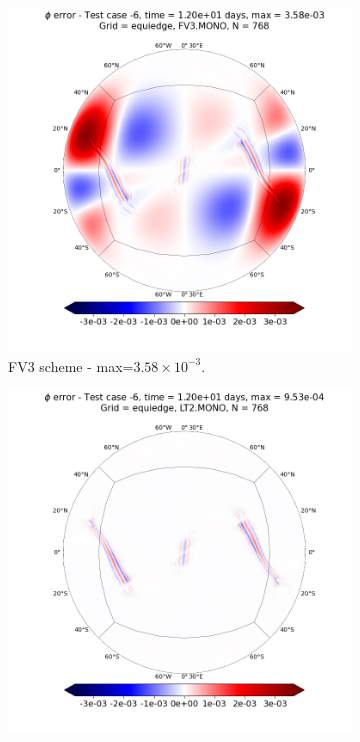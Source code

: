\documentclass[preprint,12pt]{elsarticle}
\begin{document}
\begin{linenumbers}
\begin{figure}[!htb]
	\centering
	\begin{subfigure}{0.45\textwidth}
		\centering
		\includegraphics[width=1.1\linewidth]{h_error_tc-6_t12_alpha0_C768_g0_dg2_adv1_hord8_mf1_tf12}
		\caption{FV3 scheme - max=$3.58 \times 10^{-3}$. \label{divnair-error-FV3}}
	\end{subfigure}
	\begin{subfigure}{0.45\textwidth}
		\centering
		\includegraphics[width=1.1\linewidth]{h_error_tc-6_t12_alpha0_C768_g0_dg2_adv2_hord8_mf1_tf12}

\end{subfigure}
\end{figure}
\end{linenumbers}
\end{document}
